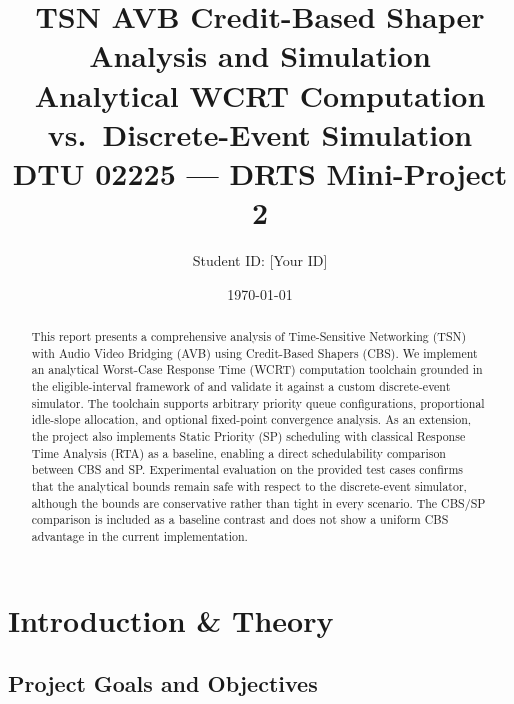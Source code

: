 \documentclass[11pt,a4paper]{article}
\title{\textbf{TSN AVB Credit-Based Shaper Analysis and Simulation}\\
    \large Analytical WCRT Computation vs.\ Discrete-Event Simulation\\
    \normalsize DTU 02225 --- DRTS Mini-Project 2}
\author{Student ID: [Your ID]}
\date{\today}
\begin{document}
\maketitle

\begin{abstract}
This report presents a comprehensive analysis of Time-Sensitive Networking (TSN)
with Audio Video Bridging (AVB) using Credit-Based Shapers (CBS).
We implement an analytical Worst-Case Response Time (WCRT) computation toolchain
grounded in the eligible-interval framework of \cite{Cao2016,Cao2018} and
validate it against a custom discrete-event simulator.
The toolchain supports arbitrary priority queue configurations, proportional
idle-slope allocation, and optional fixed-point convergence analysis.
As an extension, the project also implements Static Priority (SP) scheduling
with classical Response Time Analysis (RTA) as a baseline, enabling a
direct schedulability comparison between CBS and SP.
Experimental evaluation on the provided test cases confirms that the
analytical bounds remain safe with respect to the discrete-event simulator,
although the bounds are conservative rather than tight in every scenario.
The CBS/SP comparison is included as a baseline contrast and does not show
a uniform CBS advantage in the current implementation.
\end{abstract}

\tableofcontents
\newpage

\section{Introduction \& Theory}

\subsection{Project Goals and Objectives}
\end{document}
